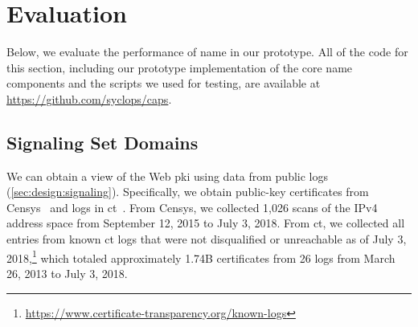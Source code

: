 \section{Evaluation}
\label{sec:evaluation}

Below, we evaluate the performance of \ac{name} in our prototype. All of the
code for this section, including our prototype implementation of the core
\ac{name} components and the scripts we used for testing, are available at
\url{https://github.com/syclops/caps}.

\subsection{Signaling Set Domains}
\label{sec:evaluation:https}


We can obtain a view of the Web \ac{pki} using data from public logs
(\autoref{sec:design:signaling}). Specifically, we obtain public-key
certificates from Censys~\cite{durumeric2015search} and logs in
\ac{ct}~\cite{rfc6962}. From Censys, we collected 1,026 scans of the IPv4
address space from September 12, 2015 to July 3, 2018. From \ac{ct}, we
collected all entries from known \ac{ct} logs that were not disqualified or
unreachable as of July 3,
2018,\footnote{\url{https://www.certificate-transparency.org/known-logs}} which
totaled approximately 1.74B certificates from 26 logs from March 26, 2013 to
July 3, 2018.


